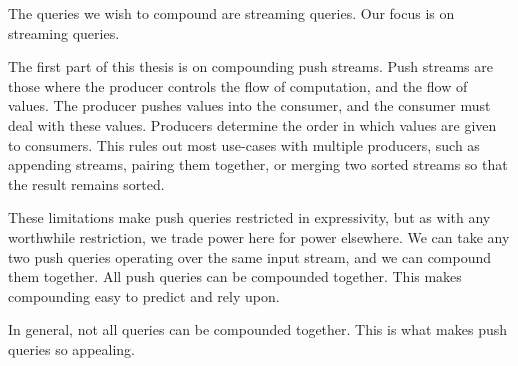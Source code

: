 The queries we wish to compound are streaming queries.
Our focus is on streaming queries.

The first part of this thesis is on compounding push streams.
Push streams are those where the producer controls the flow of computation, and the flow of values.
The producer pushes values into the consumer, and the consumer must deal with these values.
Producers determine the order in which values are given to consumers.
This rules out most use-cases with multiple producers, such as appending streams, pairing them together, or merging two sorted streams so that the result remains sorted.

These limitations make push queries restricted in expressivity, but as with any worthwhile restriction, we trade power here for power elsewhere.
We can take any two push queries operating over the same input stream, and we can compound them together.
All push queries can be compounded together.
This makes compounding easy to predict and rely upon.

In general, not all queries can be compounded together.
This is what makes push queries so appealing.

